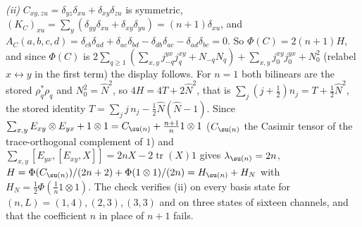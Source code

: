 \emph{(ii)} $C_{xy,zu} = \delta_{yz}\delta_{xu} + \delta_{xy}\delta_{zu}$ is symmetric, $(K_{C})_{xu} = \sum_{y}(\delta_{yy}\delta_{xu} + \delta_{xy}\delta_{yu}) = (n + 1)\delta_{xu}$, and $A_{C}(a, b, c, d) = \delta_{cb}\delta_{ad} + \delta_{ac}\delta_{bd} - \delta_{db}\delta_{ac} - \delta_{ad}\delta_{bc} = 0$. So $\Phi(C) = 2(n + 1)H$, and since $\Phi(C)$ is $2\sum_{q\ge1}(\sum_{x,y}j^{yx}_{-q}j^{xy}_{q} + N_{-q}N_{q}) + \sum_{x,y}j^{xy}_{0}j^{yx}_{0} + N_{0}^{2}$ (relabel $x \leftrightarrow y$ in the first term) the display follows. For $n = 1$ both bilinears are the stored $\rho_{q}^{*}\rho_{q}$ and $N_{0}^{2} = \hat N^{2}$, so $4H = 4T + 2\hat N^{2}$, that is $\sum_{j}(j + \tfrac12)n_{j} = T + \tfrac12\hat N^{2}$, the stored identity $T = \sum_{j}j\,n_{j} - \tfrac12\hat N(\hat N - 1)$. Since $\sum_{x,y}E_{xy}\otimes E_{yx} + 1\otimes 1 = C_{\su(n)} + \tfrac{n + 1}{n}1\otimes 1$ ($C_{\su(n)}$ the Casimir tensor of the trace-orthogonal complement of $1$) and $\sum_{x,y}[E_{yx}, [E_{xy}, X]] = 2nX - 2\operatorname{tr}(X)1$ gives $\lambda_{\su(n)} = 2n$, $H = \Phi(C_{\su(n)})/(2n + 2) + \Phi(1\otimes 1)/(2n) = H_{\su(n)} + H_{N}$ with $H_{N} = \tfrac12\Phi(\tfrac1n 1\otimes 1)$. The check verifies (ii) on every basis state for $(n, L) = (1, 4), (2, 3), (3, 3)$ and on three states of sixteen channels, and that the coefficient $n$ in place of $n + 1$ fails.


